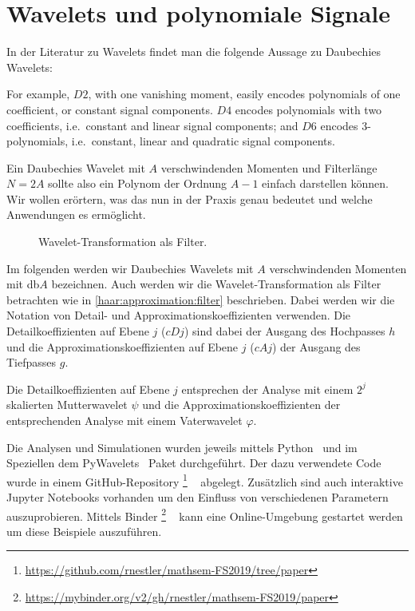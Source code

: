 %
%
%
\chapter{Wavelets und polynomiale Signale\label{chapter:polynomials}}
\begin{refsection}

{\parindent=0pt
In} der Literatur zu Wavelets findet man die folgende Aussage zu Daubechies
Wavelets:
%
\begin{displayquote}
For example, $D2$, with one vanishing moment, easily encodes polynomials of one
coefficient, or constant signal components. $D4$ encodes polynomials with two
coefficients, i.e.\ constant and linear signal components; and $D6$ encodes
3-polynomials, i.e.\ constant, linear and quadratic signal components.
\end{displayquote}
Ein Daubechies Wavelet mit $A$ verschwindenden Momenten und Filterlänge $N=2A$
%
sollte also ein Polynom der Ordnung $A-1$ einfach darstellen können. Wir wollen
%
erörtern, was das nun in der Praxis genau bedeutet und welche Anwendungen es
ermöglicht.

\begin{figure}
    \centering
    
    \caption{Wavelet-Transformation als Filter.\label{polynomials:filter}}
\end{figure}

Im folgenden werden wir Daubechies Wavelets mit $A$ verschwindenden Momenten
mit db$A$ bezeichnen. Auch werden wir die Wavelet-Transformation als Filter
betrachten wie in \cref{haar:approximation:filter} beschrieben. Dabei werden
wir die Notation von Detail- und Approximationskoeffizienten verwenden. Die
Detailkoeffizienten auf Ebene $j$ ($cDj$) sind dabei der Ausgang des Hochpasses
%
%
$h$ und die Approximationskoeffizienten auf Ebene $j$ ($cAj$) der Ausgang des
%
%
Tiefpasses $g$.

Die Detailkoeffizienten auf Ebene $j$ entsprechen der Analyse mit einem $2^j$
skalierten Mutterwavelet $\psi$ und die Approximationskoeffizienten der
entsprechenden Analyse mit einem Vaterwavelet $\varphi$.

Die Analysen und Simulationen wurden jeweils mittels Python~\cite{python} und im
%
Speziellen dem PyWavelets~\cite{gregory_r_lee_2019_2634243} Paket durchgeführt.
%
Der dazu verwendete Code wurde in einem GitHub-Repository%
\footnote{\url{https://github.com/rnestler/mathsem-FS2019/tree/paper}}%
~\cite{polynomials:repo}
abgelegt. Zusätzlich sind auch interaktive Jupyter Notebooks vorhanden um den
%
Einfluss von verschiedenen Parametern auszuprobieren. Mittels
Binder%
\footnote{\url{https://mybinder.org/v2/gh/rnestler/mathsem-FS2019/paper}}%
~\cite{project_jupyter-proc-scipy-2018}
%
kann eine Online-Umgebung gestartet werden um diese Beispiele auszuführen.


\end{refsection}
